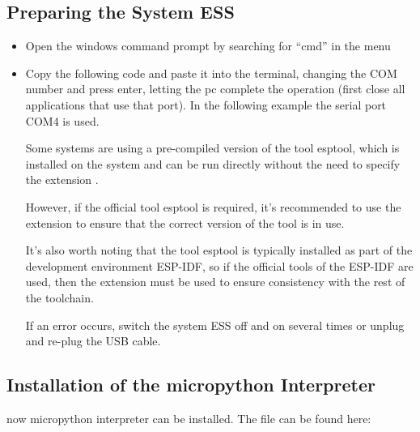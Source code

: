 \subsection{Preparing the System ESS}

\begin{itemize}

  \item Open the windows command prompt by searching for ``cmd'' in the menu
  \item Copy the following code and paste it into the terminal, changing the COM number and press enter, letting the pc complete the operation (first close all applications that use that port). In the following example the serial port COM4 is used.

      \medskip
      

     \medskip
     
Some systems are using a pre-compiled version of the tool esptool, which is installed on the system and can be run directly without the need to specify the extension .
     
However, if the official tool esptool is required, it's recommended to use the extension  to ensure that  the correct version of the tool is in use.
     
It's also worth noting that the tool esptool is typically installed as part of the development environment ESP-IDF, so if the official tools of the ESP-IDF are used, then the extension  must be used to ensure consistency with the rest of the toolchain.
   
\bigskip

If an error occurs, switch the system  ESS off and on several times or unplug and re-plug the USB cable.

\end{itemize}

\subsection{Installation of the micropython Interpreter}

now micropython interpreter can be installed. The file can be found here:

        \medskip


        \medskip
  
